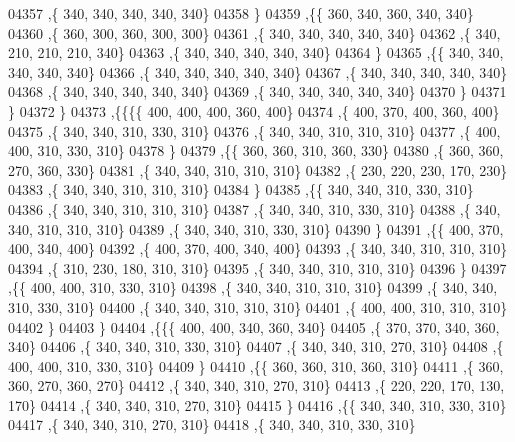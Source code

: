 \begin{DoxyCode}
04357     ,\{   340,   340,   340,   340,   340\}
04358     \}
04359    ,\{\{   360,   340,   360,   340,   340\}
04360     ,\{   360,   300,   360,   300,   300\}
04361     ,\{   340,   340,   340,   340,   340\}
04362     ,\{   340,   210,   210,   210,   340\}
04363     ,\{   340,   340,   340,   340,   340\}
04364     \}
04365    ,\{\{   340,   340,   340,   340,   340\}
04366     ,\{   340,   340,   340,   340,   340\}
04367     ,\{   340,   340,   340,   340,   340\}
04368     ,\{   340,   340,   340,   340,   340\}
04369     ,\{   340,   340,   340,   340,   340\}
04370     \}
04371    \}
04372   \}
04373  ,\{\{\{\{   400,   400,   400,   360,   400\}
04374     ,\{   400,   370,   400,   360,   400\}
04375     ,\{   340,   340,   310,   330,   310\}
04376     ,\{   340,   340,   310,   310,   310\}
04377     ,\{   400,   400,   310,   330,   310\}
04378     \}
04379    ,\{\{   360,   360,   310,   360,   330\}
04380     ,\{   360,   360,   270,   360,   330\}
04381     ,\{   340,   340,   310,   310,   310\}
04382     ,\{   230,   220,   230,   170,   230\}
04383     ,\{   340,   340,   310,   310,   310\}
04384     \}
04385    ,\{\{   340,   340,   310,   330,   310\}
04386     ,\{   340,   340,   310,   310,   310\}
04387     ,\{   340,   340,   310,   330,   310\}
04388     ,\{   340,   340,   310,   310,   310\}
04389     ,\{   340,   340,   310,   330,   310\}
04390     \}
04391    ,\{\{   400,   370,   400,   340,   400\}
04392     ,\{   400,   370,   400,   340,   400\}
04393     ,\{   340,   340,   310,   310,   310\}
04394     ,\{   310,   230,   180,   310,   310\}
04395     ,\{   340,   340,   310,   310,   310\}
04396     \}
04397    ,\{\{   400,   400,   310,   330,   310\}
04398     ,\{   340,   340,   310,   310,   310\}
04399     ,\{   340,   340,   310,   330,   310\}
04400     ,\{   340,   340,   310,   310,   310\}
04401     ,\{   400,   400,   310,   310,   310\}
04402     \}
04403    \}
04404   ,\{\{\{   400,   400,   340,   360,   340\}
04405     ,\{   370,   370,   340,   360,   340\}
04406     ,\{   340,   340,   310,   330,   310\}
04407     ,\{   340,   340,   310,   270,   310\}
04408     ,\{   400,   400,   310,   330,   310\}
04409     \}
04410    ,\{\{   360,   360,   310,   360,   310\}
04411     ,\{   360,   360,   270,   360,   270\}
04412     ,\{   340,   340,   310,   270,   310\}
04413     ,\{   220,   220,   170,   130,   170\}
04414     ,\{   340,   340,   310,   270,   310\}
04415     \}
04416    ,\{\{   340,   340,   310,   330,   310\}
04417     ,\{   340,   340,   310,   270,   310\}
04418     ,\{   340,   340,   310,   330,   310\}

\end{DoxyCode}
